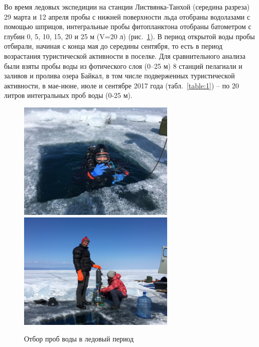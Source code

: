 \documentclass[a4paper,12pt,openany,final]{extreport}
\def\oldcaption{} \let\oldcaption=\caption
\def\caption{\stepcounter{captionsnum}\oldcaption}
\begin{document}
Во время ледовых экспедиции на станции Листвянка-Танхой (середина
разреза) 29 марта и 12 апреля пробы с нижней поверхности льда отобраны
водолазами с помощью шприцов, интегральные пробы фитопланктона отобраны
батометром с глубин 0, 5, 10, 15, 20 и 25 м (V=20 л) (рис.~\ref{fig:photo1}). В период
открытой воды пробы отбирали, начиная с конца мая до середины сентября,
то есть в период возрастания туристической активности в поселке. Для
сравнительного анализа были взяты пробы воды из фотического слоя (0--25
м) 8 станций пелагиали и заливов и пролива озера Байкал, в том числе
подверженных туристической активности, в мае-июне, июле и сентябре 2017
года (табл.~\ref{table:1}) -- по 20 литров интегральных проб воды (0-25 м).

\begin{figure}\centering
  \includegraphics[height=2.23in]{media/image1.jpeg}\quad
  \includegraphics[height=2.23in]{media/image2.jpeg}
  \caption{ Отбор  проб  воды  в  ледовый  период }\label{fig:photo1}
\end{figure}
\end{document}
